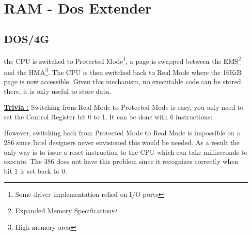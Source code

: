 \section{RAM - Dos Extender}

\subsection{DOS/4G}

the CPU is switched to Protected Mode\footnote{Some driver implementation relied on I/O ports}, a page is swapped between the EMS\footnote{Expanded Memory Specification} and the HMA\footnote{High memory area}. The CPU is then switched back to Real Mode where the 16KiB page is now accessible. Given this mechanism, no executable code can be stored there, it is only useful to store data.\\
\par
\textbf{\underline{Trivia :}} Switching from Real Mode to Protected Mode is easy, you only need to set the Control Register bit 0 to 1. It can be done with 6 instructions:
\par
{}
\par
However, switching back from Protected Mode to Real Mode is impossible on a 286 since Intel designers never envisioned this would be needed. As a result the only way is to issue a reset instruction  to the CPU which can take milliseconds to execute. The 386 does not have this problem since it recognizes correctly when  bit 1 is set back to 0.
